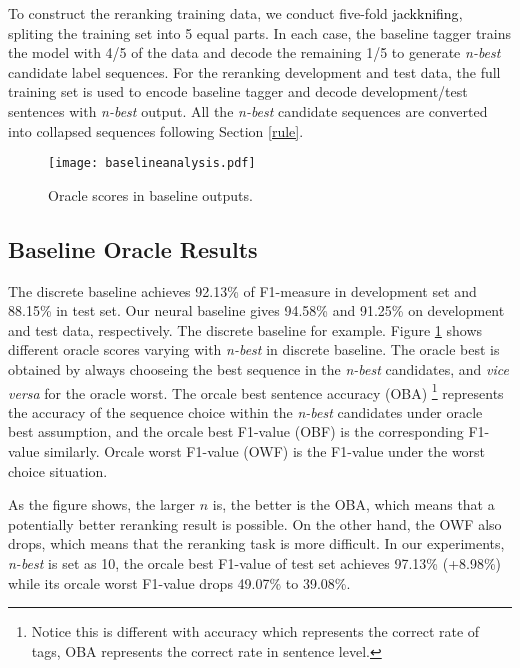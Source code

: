 \documentclass[11pt,a4paper]{article}
\begin{document}
To construct the reranking training data, we conduct five-fold \textcolor{black}{jackknifing}, spliting the training set into 5 equal parts. In each case, the baseline tagger trains the model with 4/5 of the data and decode the remaining 1/5 to generate \textit{n-best} candidate label sequences. For the reranking development and test data, the full training set is used to encode baseline tagger and decode development/test sentences with \textit{n-best} output. All the \textit{n-best} candidate sequences are converted into collapsed sequences following Section \ref{rule}. 





\begin{figure}[t] 
  \centering 
  \texttt{[image: baselineanalysis.pdf]}
  \caption{Oracle scores in baseline outputs.}
  \label{fig:baseline}
\end{figure}

\subsection{Baseline Oracle Results}
The discrete baseline achieves 92.13\% of F1-measure in development set and 88.15\% in test set. Our neural baseline gives 94.58\% and 91.25\% on development and test data, respectively. The discrete baseline for example. Figure \ref{fig:baseline} shows different oracle scores varying with \textit{n-best} in discrete baseline. The oracle best is obtained by always chooseing the best sequence in the \textit{n-best} candidates, and \textit{vice versa} for the oracle worst. The orcale best sentence  accuracy (OBA) \footnote{Notice this is different with accuracy which represents the correct rate of tags, OBA represents the correct rate in sentence level.} represents the accuracy of the sequence choice within the \textit{n-best} candidates under oracle best assumption, and the orcale best F1-value (OBF) is the corresponding F1-value similarly. Orcale worst F1-value (OWF) is the F1-value under the worst choice situation. 

As the figure shows, the larger $n$ is, the better is the OBA, which means that a potentially better reranking result is possible. On the other hand, the OWF also drops, which means that the reranking task is more difficult. In our experiments, \textit{n-best} is set as 10, the orcale best F1-value of test set achieves 97.13\% (+8.98\%) while its orcale worst F1-value drops 49.07\% to 39.08\%. 
\end{document}
